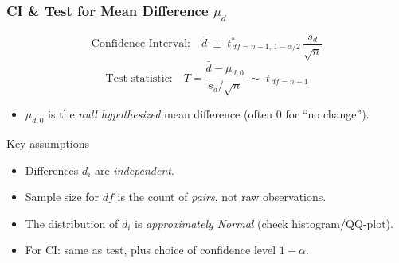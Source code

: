 \documentclass[handout]{beamer}
\begin{document}
\begin{frame}
\frametitle{CI \& Test for Mean Difference \(\mu_d\)}
\[
\text{Confidence Interval:}
\quad
\bar d \;\pm\; t^{\ast}_{\,df=n-1,\,1-\alpha/2}\,\frac{s_d}{\sqrt n}
\]
\[
\text{Test statistic:}
\quad
T = \frac{\bar d - \mu_{d,0}}{s_d/\sqrt n}
\;\sim\; t_{\,df=n-1}
\]
\begin{itemize}
    \item \(\mu_{d,0}\) is the \emph{null hypothesized} mean difference (often 0 for “no change”).  
\end{itemize}
\begin{block}{Key assumptions}
\begin{itemize}
  \item Differences \(d_i\) are \emph{independent}.  
  \item  Sample size for \(df\) is the count of \emph{pairs}, not raw observations.
  \item The distribution of \(d_i\) is \emph{approximately Normal} (check histogram/QQ‐plot).  
  \item For CI: same as test, plus choice of confidence level \(1-\alpha\).  
\end{itemize}
\end{block}
\end{frame}
\end{document}

